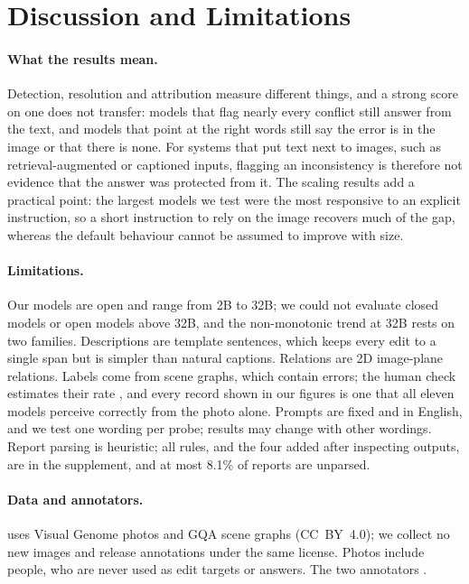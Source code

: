 \section{Discussion and Limitations}
\label{sec:discussion}

\paragraph{What the results mean.}
Detection, resolution and attribution measure different things, and a strong score on one does not transfer: models that flag nearly every conflict still answer from the text, and models that point at the right words still say the error is in the image or that there is none. For systems that put text next to images, such as retrieval-augmented or captioned inputs, flagging an inconsistency is therefore not evidence that the answer was protected from it. The scaling results add a practical point: the largest models we test were the most responsive to an explicit instruction, so a short instruction to rely on the image recovers much of the gap, whereas the default behaviour cannot be assumed to improve with size.

\paragraph{Limitations.}
Our models are open and range from 2B to 32B; we could not evaluate closed models or open models above 32B, and the non-monotonic trend at 32B rests on two families. Descriptions are template sentences, which keeps every edit to a single span but is simpler than natural captions. Relations are 2D image-plane relations. Labels come from scene graphs, which contain errors; the human check estimates their rate , and every record shown in our figures is one that all eleven models perceive correctly from the photo alone. Prompts are fixed and in English, and we test one wording per probe; results may change with other wordings. Report parsing is heuristic; all rules, and the four added after inspecting outputs, are in the supplement, and at most 8.1\% of reports are unparsed.

\paragraph{Data and annotators.}
\name uses Visual Genome photos and GQA scene graphs (CC~BY~4.0); we collect no new images and release annotations under the same license. Photos include people, who are never used as edit targets or answers. The two annotators .

